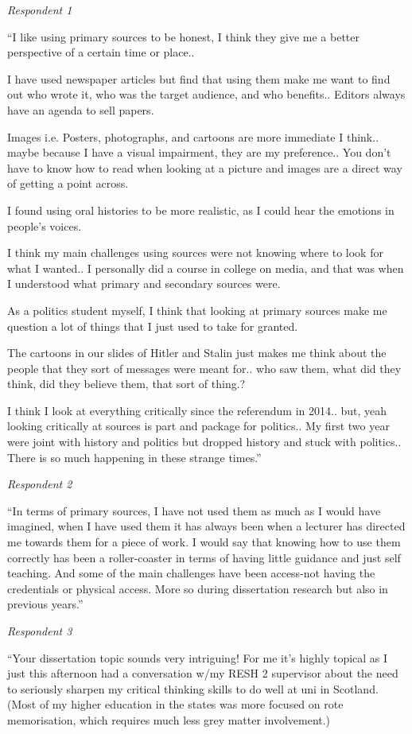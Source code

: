 \documentclass{l4proj}
\begin{document}
\begin{appendices}
\emph{Respondent 1}

“I like using primary sources to be honest, I think they give me a better perspective of a certain time or place..

I have used newspaper articles but find that using them make me want to find out who wrote it, who was the target audience, and who benefits.. Editors always have an agenda to sell papers.

Images i.e. Posters, photographs, and cartoons are more immediate I think.. maybe because I have a visual impairment, they are my preference.. You don't have to know how to read when looking at a picture and images are a direct way of getting a point across.

I found using oral histories to be more realistic, as I could hear the emotions in people's voices.

I think my main challenges using sources were not knowing where to look for what I wanted.. I personally did a course in college on media, and that was when I understood what primary and secondary sources were.

As a politics student myself, I think that looking at primary sources make me question a lot of things that I just used to take for granted.

The cartoons in our slides of Hitler and Stalin just makes me think about the people that they sort of messages were meant for.. who saw them, what did they think, did they believe them, that sort of thing.?

I think I look at everything critically since the referendum in 2014.. but, yeah looking critically at sources is part and package for politics.. My first two year were joint with history and politics but dropped history and stuck with politics.. There is so much happening in these strange times.”

\emph{Respondent 2}

“In terms of primary sources, I have not used them as much as I would have imagined, when I have used them it has always been when a lecturer has directed me towards them for a piece of work. I would say that knowing how to use them correctly has been a roller-coaster in terms of having little guidance and just self teaching. And some of the main challenges have been access-not having the credentials or physical access. More so during dissertation research but also in previous years.”

\emph{Respondent 3}

“Your dissertation topic sounds very intriguing! For me it's highly topical as I just this afternoon had a conversation w/my RESH 2 supervisor about the need to seriously sharpen my critical thinking skills to do well at uni in Scotland. (Most of my higher education in the states was more focused on rote memorisation, which requires much less grey matter involvement.)


\end{appendices}
\end{document}
